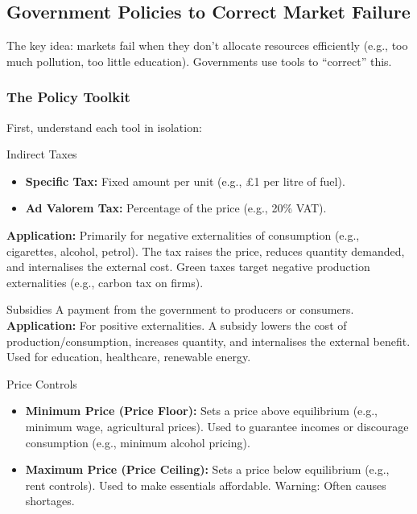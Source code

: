 \documentclass[11pt, a4paper, twoside]{book}
\begin{document}
\subsection{Government Policies to Correct Market Failure}

The key idea: markets fail when they don't allocate resources efficiently (e.g., too much pollution, too little education). Governments use tools to ``correct'' this.

\subsubsection{The Policy Toolkit}

First, understand each tool in isolation:

\begin{keyterm}{Indirect Taxes}
\begin{itemize}
  \item \textbf{Specific Tax:} Fixed amount per unit (e.g., £1 per litre of fuel).
  \item \textbf{Ad Valorem Tax:} Percentage of the price (e.g., 20\% VAT).
\end{itemize}
\textbf{Application:} Primarily for negative externalities of consumption (e.g., cigarettes, alcohol, petrol). The tax raises the price, reduces quantity demanded, and internalises the external cost. Green taxes target negative production externalities (e.g., carbon tax on firms).
\end{keyterm}

\begin{keyterm}{Subsidies}
A payment from the government to producers or consumers. \textbf{Application:} For positive externalities. A subsidy lowers the cost of production/consumption, increases quantity, and internalises the external benefit. Used for education, healthcare, renewable energy.
\end{keyterm}

\begin{keyterm}{Price Controls}
\begin{itemize}
  \item \textbf{Minimum Price (Price Floor):} Sets a price above equilibrium (e.g., minimum wage, agricultural prices). Used to guarantee incomes or discourage consumption (e.g., minimum alcohol pricing).
  \item \textbf{Maximum Price (Price Ceiling):} Sets a price below equilibrium (e.g., rent controls). Used to make essentials affordable. Warning: Often causes shortages.
\end{itemize}
\end{keyterm}
\end{document}
